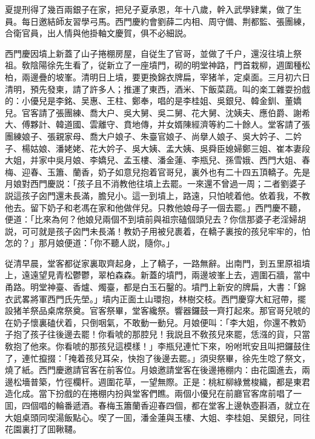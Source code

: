 夏提刑得了幾百兩銀子在家，把兒子夏承恩，年十八歲，幹入武學肄業，做了生員。每日邀結師友習學弓馬。西門慶約會劉薛二内相、周守備、荆都監、張團練，合衛官員，出人情與他掛軸文慶賀，俱不必細説。

西門慶因墳上新蓋了山子捲棚房屋，自従生了官哥，並做了千户，還沒往墳上祭祖。敎陰陽徐先生看了，従新立了一座墳門，砌的明堂神路，門首栽柳，週圍種松柏，兩邊疊的坡峯。清明日上墳，要更換錦衣牌扁，宰猪羊，定桌面。三月初六日清明，預先發柬，請了許多人；推運了東西，酒米、下飯菜蔬。叫的楽工雜耍扮戲的：小優兒是李銘、吴惠、王柱、鄭奉，唱的是李桂姐、吳銀兒、韓金釧、董嬌兒。官客請了張團練、喬大户、吳大舅、吳二舅、花大舅、沈姨夫、應伯爵、謝希大、傅夥計、韓道國、雲離守、賁地傳，并女婿陳經濟等約二十餘人。堂客請了張團練娘子、張親家母、喬大户娘子、朱臺官娘子、尚擧人娘子、吳大妗子、二妗子、楊姑娘、潘姥姥、花大妗子、吳大姨、孟大姨、吳舜臣媳婦鄭三姐、崔本妻段大姐，并家中吳月娘、李嬌兒、孟玉樓、潘金蓮、李瓶兒、孫雪娥、西門大姐、春梅、迎春、玉簫、蘭香，奶子如意兒抱着官哥兒，裏外也有二十四五頂轎子。先是月娘對西門慶説：「孩子且不消教他往墳上去罷。一來還不曾過一周；二者劉婆子説這孩子囟門還未長滿，膽兒小。這一到墳上，路遠，只怕唬着他。依着我，不教他去。留下奶子和老馮在家和他做伴兒。只教他娘母子一個去罷。」西門慶不聽，便道：「比來為何？他娘兒兩個不到墳前與祖宗磕個頭兒去？你信那婆子老淫婦胡説，可可就是孩子囟門未長滿！教奶子用被兒裹着，在轎子裏按的孩兒牢牢的，怕怎的？」那月娘便道：「你不聽人説，隨你。」

従清早晨，堂客都従家裏取齊起身，上了轎子，一路無辭。出南門，到五里原祖墳上，遠遠望見青松鬱鬱，翠柏森森。新蓋的墳門，兩邊坡峯上去，週圍石牆，當中甬路。明堂神臺、香爐、燭臺，都是白玉石鑿的。墳門上新安的牌扁，大書：「錦衣武畧將軍西門氏先塋。」墳内正面土山環抱，林樹交枝。西門慶穿大紅冠帶，擺設猪羊祭品桌席祭奠。官客祭畢，堂客纔祭。響器鑼鼓一齊打起來。那官哥兒唬的在奶子懷裏磕伏着，只倒咽氣，不敢動一動兒。月娘便叫：「李大姐，你還不教奶子抱了孩子往後邊去罷！你看唬的那腔兒！我説且不敎孩兒來罷，恁漒的貨，只當敎抱了他來。你看唬的那孩兒這模樣！」李瓶兒連忙下來，吩咐玳安且叫把鑼鼓住了，連忙攛掇：「掩着孩兒耳朵，快抱了後邊去罷。」須臾祭畢，徐先生唸了祭文，燒了紙。西門慶邀請官客在前客位。月娘邀請堂客在後邊捲棚内：由花園進去，兩邊松墻普築，竹徑欄杆。週圍花草，一望無際。正是：桃紅柳綠鶯梭織，都是東君造化成。當下扮戲的在捲棚内扮與堂客們瞧。兩個小優兒在前廳官客席前唱了一囬，四個唱的輪番遞酒。春梅玉簫蘭香迎春四個，都在堂客上邊執壺斟酒，就立在大姐桌頭同喫湯飯點心。喫了一囬，潘金蓮與玉樓、大姐、李桂姐、吴銀兒，同往花園裏打了囬鞦韆。


